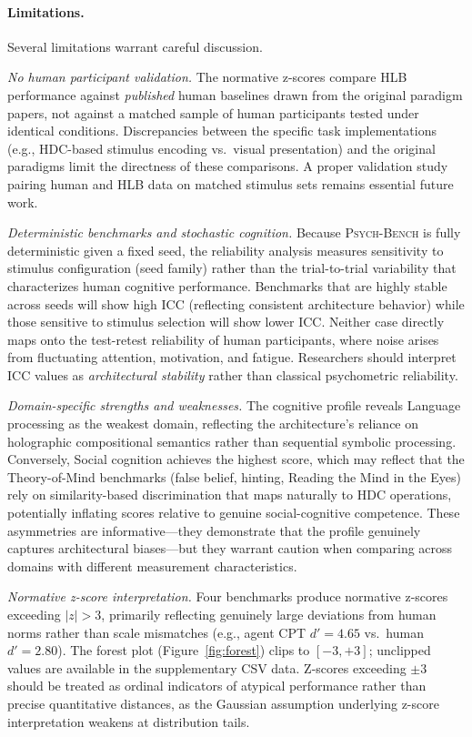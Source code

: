 \documentclass[11pt,letterpaper]{article}
\newcommand{\psychbench}{\textsc{Psych-Bench}}
\newcommand{\hlb}{\textsc{HLB}}
\begin{document}
\paragraph{Limitations.} Several limitations warrant careful discussion.

\emph{No human participant validation.} The normative z-scores compare \hlb{} performance against \emph{published} human baselines drawn from the original paradigm papers, not against a matched sample of human participants tested under identical conditions. Discrepancies between the specific task implementations (e.g., HDC-based stimulus encoding vs.\ visual presentation) and the original paradigms limit the directness of these comparisons. A proper validation study pairing human and \hlb{} data on matched stimulus sets remains essential future work.

\emph{Deterministic benchmarks and stochastic cognition.} Because \psychbench{} is fully deterministic given a fixed seed, the reliability analysis measures sensitivity to stimulus configuration (seed family) rather than the trial-to-trial variability that characterizes human cognitive performance. Benchmarks that are highly stable across seeds will show high ICC (reflecting consistent architecture behavior) while those sensitive to stimulus selection will show lower ICC. Neither case directly maps onto the test-retest reliability of human participants, where noise arises from fluctuating attention, motivation, and fatigue. Researchers should interpret ICC values as \emph{architectural stability} rather than classical psychometric reliability.

\emph{Domain-specific strengths and weaknesses.} The cognitive profile reveals Language processing as the weakest domain, reflecting the architecture's reliance on holographic compositional semantics rather than sequential symbolic processing. Conversely, Social cognition achieves the highest score, which may reflect that the Theory-of-Mind benchmarks (false belief, hinting, Reading the Mind in the Eyes) rely on similarity-based discrimination that maps naturally to HDC operations, potentially inflating scores relative to genuine social-cognitive competence. These asymmetries are informative---they demonstrate that the profile genuinely captures architectural biases---but they warrant caution when comparing across domains with different measurement characteristics.

\emph{Normative z-score interpretation.} Four benchmarks produce normative z-scores exceeding $|z| > 3$, primarily reflecting genuinely large deviations from human norms rather than scale mismatches (e.g., agent CPT $d' = 4.65$ vs.\ human $d' = 2.80$). The forest plot (Figure~\ref{fig:forest}) clips to $[-3, +3]$; unclipped values are available in the supplementary CSV data. Z-scores exceeding $\pm 3$ should be treated as ordinal indicators of atypical performance rather than precise quantitative distances, as the Gaussian assumption underlying z-score interpretation weakens at distribution tails.
\end{document}
